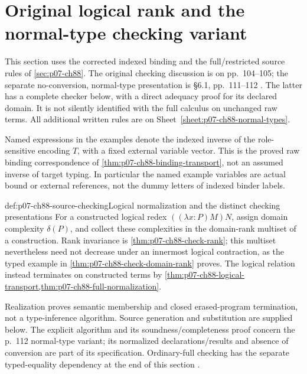 \section{Original logical rank and the normal-type checking variant}
\label{sec:p07-ch88-checking}

This section uses the corrected indexed binding and the full/restricted
source rules of \cref{sec:p07-ch88}. The original checking discussion is
on pp.~104--105; the separate no-conversion, normal-type presentation is
\S6.1, pp.~111--112 \cite{CoquandHuet1988}. The latter has a complete
checker below, with a direct adequacy proof for its declared domain.
It is not silently identified with the full calculus on unchanged raw
terms. All additional written rules are on
Sheet~\ref{sheet:p07-ch88-normal-types}.

Named expressions in the examples denote the indexed inverse of the
role-sensitive encoding \(T\), with a fixed external variable vector.
This is the proved raw binding correspondence of
\cref{thm:p07-ch88-binding-transport}, not an assumed inverse of target
typing. In particular the named example variables are actual bound or
external references, not the dummy letters of indexed binder labels.

\begin{hbmethod}{def:p07-ch88-source-checking}{Logical normalization and the distinct checking presentations}
For a constructed logical redex \(((\lambda x:P)M)N\), assign
domain complexity \(\delta(P)\), and collect these complexities
in the domain-rank multiset of a construction. Rank invariance is
\cref{thm:p07-ch88-check-rank}; this multiset nevertheless need not
decrease under an innermost logical contraction, as the typed example
in \cref{thm:p07-ch88-check-domain-rank} proves. The logical relation
instead terminates on constructed terms by
\cref{thm:p07-ch88-logical-transport,thm:p07-ch88-full-normalization}.

Realization proves semantic membership and closed erased-program
termination, not a type-inference algorithm. Source generation and
substitution are supplied below. The explicit algorithm and its
soundness/completeness proof concern the p.~112 normal-type variant;
its normalized declarations/results and absence of conversion are
part of its specification. Ordinary-full checking has the separate
typed-equality dependency at the end of this section
\cite[pp.~104--105,112]{CoquandHuet1988}.
\end{hbmethod}

